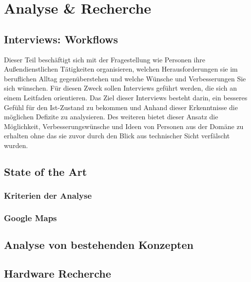 \documentclass[../Bachelorarbeit.tex]{subfiles}
\begin{document}
\chapter{Analyse \& Recherche}
\label{chap:analyse}

\section{Interviews: Workflows}
\label{chap:analyse:sec:interviews}
Dieser Teil beschäftigt sich mit der Fragestellung wie Personen ihre Außendienstlichen Tätigkeiten organisieren, welchen Herausforderungen sie im beruflichen Alltag gegenüberstehen und welche Wünsche und Verbesserungen Sie sich wünschen. 
Für diesen Zweck sollen Interviews geführt werden, die sich an einem Leitfaden orientieren. 
Das Ziel dieser Interviews besteht darin, ein besseres Gefühl für den Ist-Zustand zu bekommen und Anhand dieser Erkenntnisse die möglichen Defizite zu analysieren.
Des weiteren bietet dieser Ansatz die Möglichkeit, Verbesserungswünsche und Ideen von Personen aus der Domäne zu erhalten ohne das sie zuvor durch den Blick aus technischer Sicht verfälscht wurden.


\section{State of the Art}
\label{chap:analyse:sec:sota}


\subsection{Kriterien der Analyse}
\label{chap:analyse:sec:sota:sec:kriterien_der_analyse}


\subsection{Google Maps}
\label{chap:analyse:sec:sota:sec:google_maps}

\section{Analyse von bestehenden Konzepten}
\label{chap:analyse:sec:analyBestehendeKonz}

\section{Hardware Recherche}
\label{chap:analyse:sec:hw_recherce}

\end{document}
